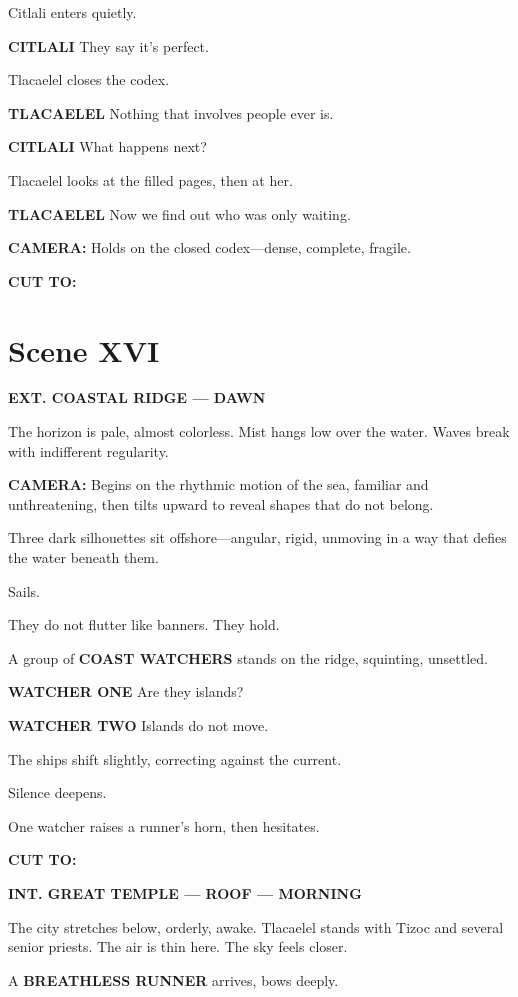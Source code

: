 \documentclass[12pt]{article}
\begin{document}
Citlali enters quietly.

\textbf{CITLALI}  
They say it’s perfect.

Tlacaelel closes the codex.

\textbf{TLACAELEL}  
Nothing that involves people ever is.

\textbf{CITLALI}  
What happens next?

Tlacaelel looks at the filled pages, then at her.

\textbf{TLACAELEL}  
Now we find out  
who was only waiting.

\textbf{CAMERA:} Holds on the closed codex—dense, complete, fragile.

\textbf{CUT TO:}

\section*{Scene XVI}

\textbf{EXT. COASTAL RIDGE — DAWN}

The horizon is pale, almost colorless. Mist hangs low over the water. Waves break with indifferent regularity.

\textbf{CAMERA:} Begins on the rhythmic motion of the sea, familiar and unthreatening, then tilts upward to reveal shapes that do not belong.

Three dark silhouettes sit offshore—angular, rigid, unmoving in a way that defies the water beneath them.

Sails.

They do not flutter like banners. They hold.

A group of \textbf{COAST WATCHERS} stands on the ridge, squinting, unsettled.

\textbf{WATCHER ONE}  
Are they islands?

\textbf{WATCHER TWO}  
Islands do not move.

The ships shift slightly, correcting against the current.

Silence deepens.

One watcher raises a runner’s horn, then hesitates.

\textbf{CUT TO:}

\textbf{INT. GREAT TEMPLE — ROOF — MORNING}

The city stretches below, orderly, awake. Tlacaelel stands with Tizoc and several senior priests. The air is thin here. The sky feels closer.

A \textbf{BREATHLESS RUNNER} arrives, bows deeply.
\end{document}
